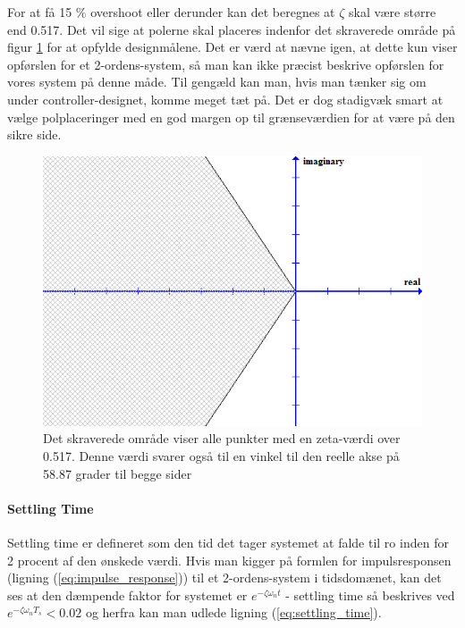 For at få 15 $\%$ overshoot eller derunder kan det beregnes at $\zeta$ skal være større end 0.517. Det vil sige at polerne skal placeres indenfor det skraverede område på figur \ref{fig:Overshoot} for at opfylde designmålene. Det er værd at nævne igen, at dette kun viser opførslen for et 2-ordens-system, så man kan ikke præcist beskrive opførslen for vores system på denne måde. Til gengæld kan man, hvis man tænker sig om under controller-designet, komme meget tæt på. Det er dog stadigvæk smart at vælge polplaceringer med en god margen op til grænseværdien for at være på den sikre side.

\begin{figure}[ht]
	\begin{center}
		\includegraphics[scale=0.5]{Billeder/Overshoot.PNG}
	\end{center}
\caption{Det skraverede område viser alle punkter med en zeta-værdi over 0.517. Denne værdi svarer også til en vinkel til den reelle akse på 58.87 grader til begge sider}
\label{fig:Overshoot}
\end{figure}

\paragraph{Settling Time}

Settling time er defineret som den tid det tager systemet at falde til ro inden for 2 procent af den ønskede værdi. Hvis man kigger på formlen for impulsresponsen (ligning (\ref{eq:impulse_response}))  til et 2-ordens-system i tidsdomænet, kan det ses at den dæmpende faktor for systemet er $e^{-\zeta\omega_{n}t}$ - settling time så beskrives ved $e^{-\zeta\omega_{n}T_{s}}<0.02$ og herfra kan man udlede ligning (\ref{eq:settling_time}).

